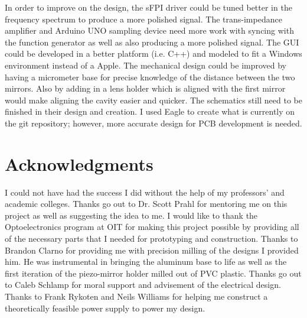 \documentclass[12pt,journal]{IEEEtran}
\begin{document}
In order to improve on the design, the sFPI driver could be tuned better in the frequency spectrum to produce a more polished signal. The trans-impedance amplifier and Arduino UNO sampling device need more work with syncing with the function generator as well as also producing a more polished signal. The GUI could be developed in a better platform (i.e. C++) and modeled to fit a Windows environment instead of a Apple. The mechanical design could be improved by having a micrometer base for precise knowledge of the distance between the two mirrors. Also by adding in a lens holder which is aligned with the first mirror would make aligning the cavity easier and quicker. The schematics still need to be finished in their design and creation. I used Eagle to create what is currently on the git repository; however, more accurate design for PCB development is needed. 


\section{Acknowledgments}

I could not have had the success I did without the help of my professors' and academic colleges. Thanks go out to Dr. Scott Prahl for mentoring me on this project as well as suggesting the idea to me. I would like to thank the Optoelectronics program at OIT for making this project possible by providing all of the necessary parts that I needed for prototyping and construction. Thanks to Brandon Clarno for providing me with precision milling of the designs I provided him. He was instrumental in bringing the aluminum base to life as well as the first iteration of the piezo-mirror holder milled out of PVC plastic. Thanks go out to Caleb Schlamp for moral support and advisement of the electrical design. Thanks to Frank Rykoten and Neils Williams for helping me construct a theoretically feasible power supply to power my design. 


\end{document}
